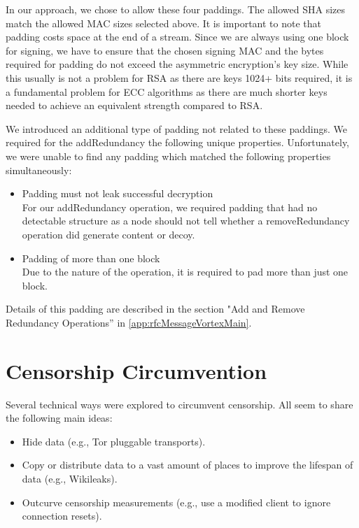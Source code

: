 In our approach, we chose to allow these four paddings. The allowed SHA sizes match the allowed MAC sizes selected above. It is important to note that padding costs space at the end of a stream. Since we are always using one block for signing, we have to ensure that the chosen signing MAC and the bytes required for padding do not exceed the asymmetric encryption's key size. While this usually is not a problem for RSA as there are keys 1024+ bits required, it is a fundamental problem for ECC algorithms as there are much shorter keys needed to achieve an equivalent strength compared to RSA. 

We introduced an additional type of padding not related to these paddings. We required for the addRedundancy the following unique properties. Unfortunately, we were unable to find any padding which matched the following properties simultaneously:

\begin{itemize}
	\item Padding must not leak successful decryption\\
	For our addRedundancy operation, we required padding that had no detectable structure as a node should not tell whether a removeRedundancy operation did generate content or decoy. 
	\item Padding of more than one block\\
	Due to the nature of the operation, it is required to pad more than just one block.
\end{itemize}

Details of this padding are described in the section "Add and Remove Redundancy Operations'' in \cref{app:rfcMessageVortexMain}. 

\chapter{Censorship Circumvention}\label{sec:censorshipResearch}
Several technical ways were explored to circumvent censorship. All seem to share the following main ideas:
\begin{itemize}
	\item Hide data (e.g., Tor pluggable transports).
	\item Copy or distribute data to a vast amount of places to improve the lifespan of data (e.g., Wikileaks).
	\item Outcurve censorship measurements (e.g., use a modified client to ignore connection resets).
\end{itemize}


